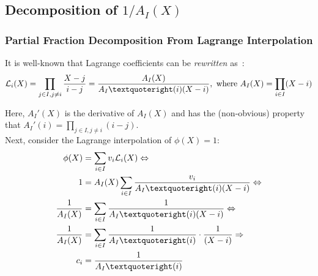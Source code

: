 \subsection{Decomposition of $1/A_I(X)$}
\begin{frame}
    \label{s:partial-fraction-decomposition}
    \frametitle{Partial Fraction Decomposition From Lagrange Interpolation}

    \small
    It is well-known that Lagrange coefficients can be \textit{rewritten} as~\cite{BT04,vG13ModernCh10}:
    \begin{align}
    \lagr_i(X)=\prod_{j\in I, j\ne i} \frac{X-j}{i - j}=\frac{A_I(X)}{A_I’(i) (X-i)},\ \text{where}\ A_I(X)=\prod_{i\in I} (X-i)
    \end{align}

    Here, $A_I'(X)$ is the derivative of $A_I(X)$ and has the (non-obvious) property that $A_I'(i)=\prod_{j\in I,j\ne i} (i-j)$.
    \\
    Next, consider the Lagrange interpolation of $\phi(X) = 1$:
    \begin{align}
    \phi(X) &= \sum_{i\in I} v_i \lagr_i(X)\Leftrightarrow\\
    1 &= A_I(X)\sum_{i\in I} \frac{v_i}{A_I’(i)(X-i)}\Leftrightarrow\\
    \frac{1}{A_I(X)} &= \sum_{i\in I} \frac{1}{A_I’(i)(X-i)}\Leftrightarrow\\
    \frac{1}{A_I(X)} &= \sum_{i\in I} \frac{1}{A_I’(i)}\cdot\frac{1}{(X-i)}\Rightarrow\\
    c_i &= \frac{1}{A_I’(i)}
    \end{align}
\end{frame}

